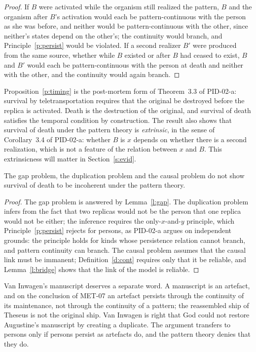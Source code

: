 \documentclass{situationist-preprint}
\begin{document}
\begin{proof}
If $B$ were activated while the organism still realized the pattern, $B$ and the organism after $B$'s activation would each be pattern-continuous with the person as she was before, and neither would be pattern-continuous with the other, since neither's states depend on the other's; the continuity would branch, and Principle~\ref{p:persist} would be violated. If a second realizer $B'$ were produced from the same source, whether while $B$ existed or after $B$ had ceased to exist, $B$ and $B'$ would each be pattern-continuous with the person at death and neither with the other, and the continuity would again branch.
\end{proof}

Proposition~\ref{p:timing} is the post-mortem form of Theorem~3.3 of PID-02-a: survival by teletransportation requires that the original be destroyed before the replica is activated. Death is the destruction of the original, and survival of death satisfies the temporal condition by construction. The result also shows that survival of death under the pattern theory is \emph{extrinsic}, in the sense of Corollary~3.4 of PID-02-a: whether $B$ is $x$ depends on whether there is a second realization, which is not a feature of the relation between $x$ and $B$. This extrinsicness will matter in Section~\ref{s:evid}.

\begin{corollary}\label{c:answers}
The gap problem, the duplication problem and the causal problem do not show survival of death to be incoherent under the pattern theory.
\end{corollary}

\begin{proof}
The gap problem is answered by Lemma~\ref{l:gap}. The duplication problem infers from the fact that two replicas would not be the person that one replica would not be either; the inference requires the only-$x$-and-$y$ principle, which Principle~\ref{p:persist} rejects for persons, as PID-02-a argues on independent grounds: the principle holds for kinds whose persistence relation cannot branch, and pattern continuity can branch. The causal problem assumes that the causal link must be immanent; Definition~\ref{d:cont} requires only that it be reliable, and Lemma~\ref{l:bridge} shows that the link of the model is reliable.
\end{proof}

Van Inwagen's manuscript deserves a separate word. A manuscript is an artefact, and on the conclusion of MET-07 an artefact persists through the continuity of its maintenance, not through the continuity of a pattern; the reassembled ship of Theseus is not the original ship. Van Inwagen is right that God could not restore Augustine's manuscript by creating a duplicate. The argument transfers to persons only if persons persist as artefacts do, and the pattern theory denies that they do.
\end{document}
